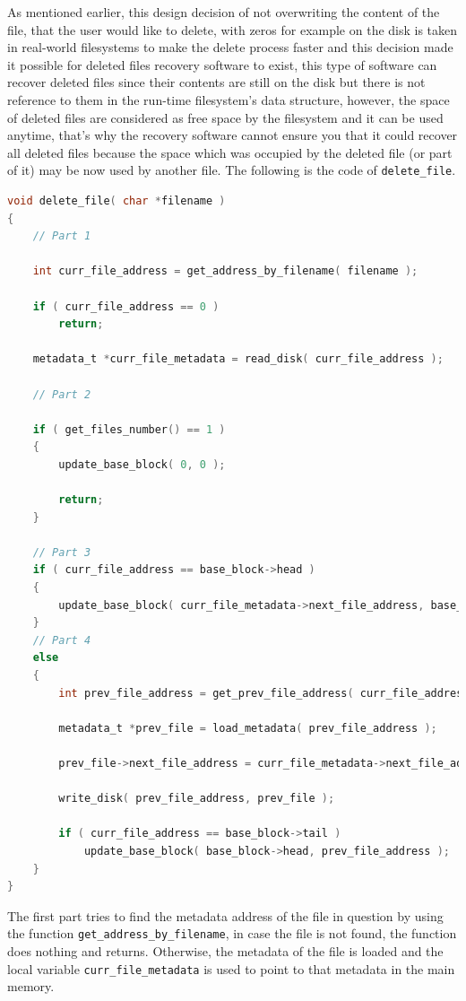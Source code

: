 As mentioned earlier, this design decision of not overwriting the
content of the file, that the user would like to delete, with zeros for
example on the disk is taken in real-world filesystems to make the
delete process faster and this decision made it possible for deleted
files recovery software to exist, this type of software can recover
deleted files since their contents are still on the disk but there is
not reference to them in the run-time filesystem's data structure,
however, the space of deleted files are considered as free space by the
filesystem and it can be used anytime, that's why the recovery software
cannot ensure you that it could recover all deleted files because the
space which was occupied by the deleted file (or part of it) may be now
used by another file. The following is the code of
\lstinline!delete_file!.

\begin{lstlisting}[language=C]
void delete_file( char *filename )
{   
    // Part 1
    
    int curr_file_address = get_address_by_filename( filename );
    
    if ( curr_file_address == 0 )
        return;
    
    metadata_t *curr_file_metadata = read_disk( curr_file_address );
    
    // Part 2
    
    if ( get_files_number() == 1 )
    {
        update_base_block( 0, 0 );
        
        return;
    }
    
    // Part 3
    if ( curr_file_address == base_block->head )
    {
        update_base_block( curr_file_metadata->next_file_address, base_block->tail );
    }
    // Part 4
    else
    {
        int prev_file_address = get_prev_file_address( curr_file_address );
        
        metadata_t *prev_file = load_metadata( prev_file_address );

        prev_file->next_file_address = curr_file_metadata->next_file_address;
        
        write_disk( prev_file_address, prev_file );
        
        if ( curr_file_address == base_block->tail )
            update_base_block( base_block->head, prev_file_address );
    }
}
\end{lstlisting}

The first part tries to find the metadata address of the file in
question by using the function \lstinline!get_address_by_filename!, in
case the file is not found, the function does nothing and returns.
Otherwise, the metadata of the file is loaded and the local variable
\lstinline!curr_file_metadata! is used to point to that metadata in the
main memory.

